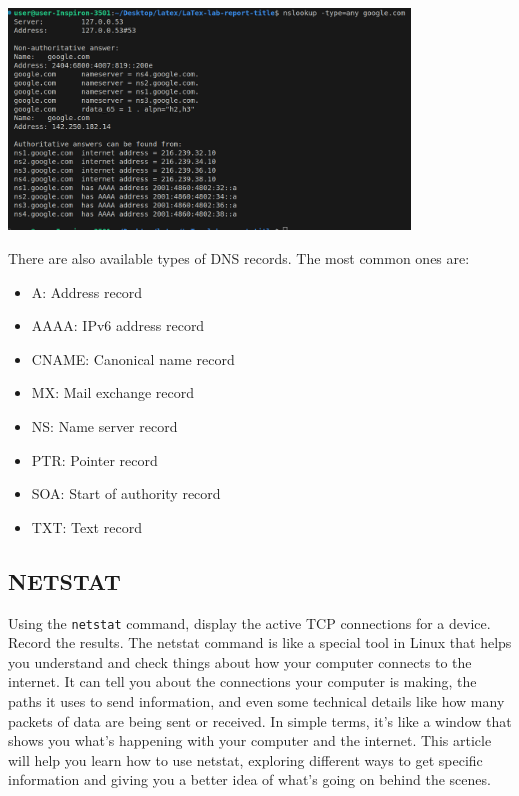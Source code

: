 \documentclass[12pt]{article}
\begin{document}
\includegraphics[width=0.8\textwidth]{nslookupAny.png}\par\vspace{1cm}


There are also available types of DNS records. The most common ones are:

\begin{itemize}
    \item A: Address record
    \item AAAA: IPv6 address record
    \item CNAME: Canonical name record
    \item MX: Mail exchange record
    \item NS: Name server record
    \item PTR: Pointer record
    \item SOA: Start of authority record
    \item TXT: Text record
\end{itemize}

\subsection*{NETSTAT}

Using the {
    \texttt{netstat}
} command, display the active TCP connections for a device. Record the results. The netstat command is like a special tool in Linux that helps you understand and check things about how your computer connects to the internet. It can tell you about the connections your computer is making, the paths it uses to send information, and even some technical details like how many packets of data are being sent or received. In simple terms, it’s like a window that shows you what’s happening with your computer and the internet. This article will help you learn how to use netstat, exploring different ways to get specific information and giving you a better idea of what’s going on behind the scenes.
\end{document}

